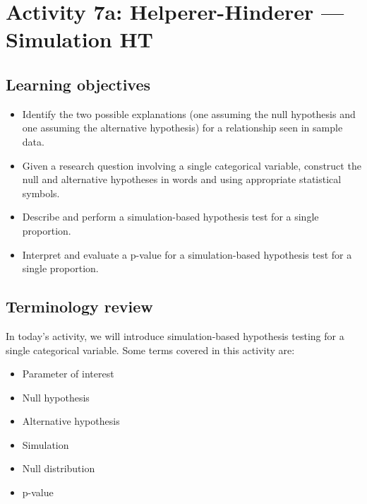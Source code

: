 \documentclass[
]{report}
\begin{document}
\newpage

\hypertarget{activity-7a-helperer-hinderer-simulation-ht}{%
\section{Activity 7a: Helperer-Hinderer --- Simulation HT}\label{activity-7a-helperer-hinderer-simulation-ht}}


\hypertarget{learning-objectives-6}{%
\subsection{Learning objectives}\label{learning-objectives-6}}

\begin{itemize}
\item
  Identify the two possible explanations (one assuming the null hypothesis and one assuming the alternative hypothesis) for a relationship seen in sample data.
\item
  Given a research question involving a single categorical variable, construct the null and alternative hypotheses
  in words and using appropriate statistical symbols.
\item
  Describe and perform a simulation-based hypothesis test for a single proportion.
\item
  Interpret and evaluate a p-value for a simulation-based hypothesis test for a single proportion.
\end{itemize}

\hypertarget{terminology-review-10}{%
\subsection{Terminology review}\label{terminology-review-10}}

In today's activity, we will introduce simulation-based hypothesis testing for a single categorical variable. Some terms covered in this activity are:

\begin{itemize}
\item
  Parameter of interest
\item
  Null hypothesis
\item
  Alternative hypothesis
\item
  Simulation
\item
  Null distribution
\item
  p-value
\end{itemize}
\end{document}
